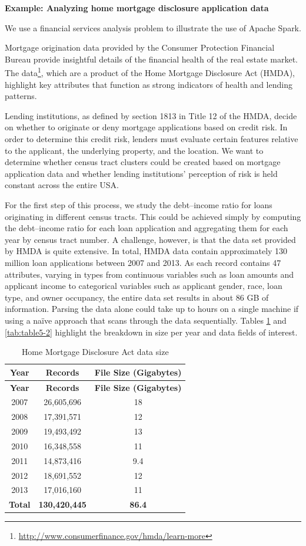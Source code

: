 \documentclass[]{krantz}
\begin{document}
\textbf{Example: Analyzing home mortgage disclosure application data}

We use a financial services analysis problem to illustrate the use of
Apache Spark.

Mortgage origination data provided by the Consumer Protection Financial
Bureau provide insightful details of the financial health of the real
estate market. The data\footnote{\url{http://www.consumerfinance.gov/hmda/learn-more}},
which are a product of the Home Mortgage Disclosure Act (HMDA),
highlight key attributes that function as strong indicators of health
and lending patterns.

Lending institutions, as defined by section 1813 in Title 12 of the
HMDA, decide on whether to originate or deny mortgage applications based
on credit risk. In order to determine this credit risk, lenders must
evaluate certain features relative to the applicant, the underlying
property, and the location. We want to determine whether census tract
clusters could be created based on mortgage application data and whether
lending institutions' perception of risk is held constant across the
entire USA.

For the first step of this process, we study the debt--income ratio for
loans originating in different census tracts. This could be achieved
simply by computing the debt--income ratio for each loan application and
aggregating them for each year by census tract number. A challenge,
however, is that the data set provided by HMDA is quite extensive. In
total, HMDA data contain approximately 130 million loan applications
between 2007 and 2013. As each record contains 47 attributes, varying in
types from continuous variables such as loan amounts and applicant
income to categorical variables such as applicant gender, race, loan
type, and owner occupancy, the entire data set results in about 86 GB of
information. Parsing the data alone could take up to hours on a single
machine if using a naïve approach that scans through the data
sequentially. Tables \ref{tab:table5-1} and \ref{tab:table5-2} highlight
the breakdown in size per year and data fields of interest.

\begin{longtable}[]{@{}ccc@{}}
\caption{\label{tab:table5-1} Home Mortgage Disclosure Act data
size}\tabularnewline
\toprule
\textbf{Year} & \textbf{Records} & \textbf{File Size
(Gigabytes)}\tabularnewline
\midrule
\endfirsthead
\toprule
\textbf{Year} & \textbf{Records} & \textbf{File Size
(Gigabytes)}\tabularnewline
\midrule
\endhead
2007 & 26,605,696 & 18\tabularnewline
2008 & 17,391,571 & 12\tabularnewline
2009 & 19,493,492 & 13\tabularnewline
2010 & 16,348,558 & 11\tabularnewline
2011 & 14,873,416 & 9.4\tabularnewline
2012 & 18,691,552 & 12\tabularnewline
2013 & 17,016,160 & 11\tabularnewline
\textbf{Total} & \textbf{130,420,445} & \textbf{86.4}\tabularnewline
\bottomrule
\end{longtable}
\end{document}
